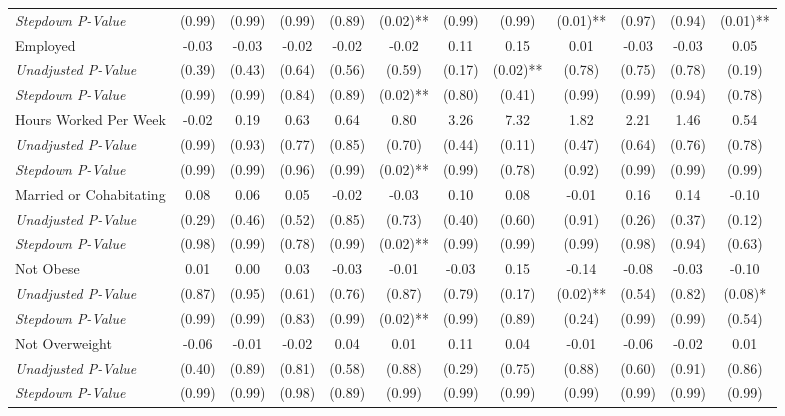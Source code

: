 \begin{tabular}{l c c c c c c c c c c c}
\quad \textit{Stepdown P-Value} & (0.99) & (0.99) & (0.99) & (0.89) & (0.02)** & (0.99) & (0.99) & (0.01)** & (0.97) & (0.94) & (0.01)** \\
Employed & -0.03 & -0.03 & -0.02 & -0.02 & -0.02 & 0.11 & 0.15 & 0.01 & -0.03 & -0.03 & 0.05 \\
\quad \textit{Unadjusted P-Value} & (0.39) & (0.43) & (0.64) & (0.56) & (0.59) & (0.17) & (0.02)** & (0.78) & (0.75) & (0.78) & (0.19) \\
\quad \textit{Stepdown P-Value} & (0.99) & (0.99) & (0.84) & (0.89) & (0.02)** & (0.80) & (0.41) & (0.99) & (0.99) & (0.94) & (0.78) \\
Hours Worked Per Week & -0.02 & 0.19 & 0.63 & 0.64 & 0.80 & 3.26 & 7.32 & 1.82 & 2.21 & 1.46 & 0.54 \\
\quad \textit{Unadjusted P-Value} & (0.99) & (0.93) & (0.77) & (0.85) & (0.70) & (0.44) & (0.11) & (0.47) & (0.64) & (0.76) & (0.78) \\
\quad \textit{Stepdown P-Value} & (0.99) & (0.99) & (0.96) & (0.99) & (0.02)** & (0.99) & (0.78) & (0.92) & (0.99) & (0.99) & (0.99) \\
Married or Cohabitating & 0.08 & 0.06 & 0.05 & -0.02 & -0.03 & 0.10 & 0.08 & -0.01 & 0.16 & 0.14 & -0.10 \\
\quad \textit{Unadjusted P-Value} & (0.29) & (0.46) & (0.52) & (0.85) & (0.73) & (0.40) & (0.60) & (0.91) & (0.26) & (0.37) & (0.12) \\
\quad \textit{Stepdown P-Value} & (0.98) & (0.99) & (0.78) & (0.99) & (0.02)** & (0.99) & (0.99) & (0.99) & (0.98) & (0.94) & (0.63) \\
Not Obese & 0.01 & 0.00 & 0.03 & -0.03 & -0.01 & -0.03 & 0.15 & -0.14 & -0.08 & -0.03 & -0.10 \\
\quad \textit{Unadjusted P-Value} & (0.87) & (0.95) & (0.61) & (0.76) & (0.87) & (0.79) & (0.17) & (0.02)** & (0.54) & (0.82) & (0.08)* \\
\quad \textit{Stepdown P-Value} & (0.99) & (0.99) & (0.83) & (0.99) & (0.02)** & (0.99) & (0.89) & (0.24) & (0.99) & (0.99) & (0.54) \\
Not Overweight & -0.06 & -0.01 & -0.02 & 0.04 & 0.01 & 0.11 & 0.04 & -0.01 & -0.06 & -0.02 & 0.01 \\
\quad \textit{Unadjusted P-Value} & (0.40) & (0.89) & (0.81) & (0.58) & (0.88) & (0.29) & (0.75) & (0.88) & (0.60) & (0.91) & (0.86) \\
\quad \textit{Stepdown P-Value} & (0.99) & (0.99) & (0.98) & (0.89) & (0.99) & (0.99) & (0.99) & (0.99) & (0.99) & (0.99) & (0.99) \\

\end{tabular}

